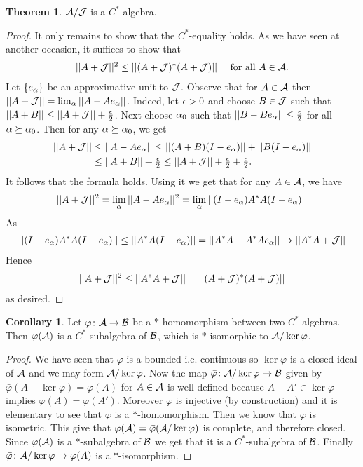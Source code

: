 \documentclass[10pt,english,a4paper]{article}
\theoremstyle{definition}
\newtheorem*{theorem}{Theorem}
\newtheorem*{corollary}{Corollary}
\begin{document}
\begin{theorem}
    $\mathcal{A} /\mathcal{J}$ is a $C^*$-algebra.
\end{theorem}
\begin{proof}
    It only remains to show that the $C^*$-equality holds. As we have seen at
another occasion, it suffices to show that 
\begin{align*}
    ||A+\mathcal{J}||^2 \leq ||(A + \mathcal{J})^*(A+ \mathcal{J})||\quad \text{ for all } A \in \mathcal{A}.
\end{align*}
Let $\{e_{\alpha}\}$ be an approximative unit to $\mathcal{J}$. Observe that for 
$A \in \mathcal{A}$ then $||A + \mathcal{J}|| = \lim_{\alpha}||A-Ae_{\alpha}||$. 
Indeed, let $\epsilon > 0$ and choose $B \in \mathcal{J}$ such that 
$||A+B|| \leq ||A+\mathcal{J}|| + \tfrac{\epsilon}{2}$. Next choose $\alpha_0$ such that 
$||B-Be_{\alpha}|| \leq \tfrac{\epsilon}{2}$ for all $\alpha \succeq \alpha_0$. 
Then for any $\alpha \succeq \alpha_0$, we get
\begin{align*}
    ||A+\mathcal{J}|| &\leq ||A-Ae_{\alpha}|| \leq ||(A+B)(I-e_{\alpha})|| + ||B(I-e_{\alpha})|| \\
&\leq ||A+B|| + \tfrac{\epsilon}{2} \leq ||A+\mathcal{J}|| + \tfrac{\epsilon}{2}+ \tfrac{\epsilon}{2}.
\end{align*}
It follows that the formula holds. Using it we get that for any $A \in \mathcal{A}$,
we have
\begin{align*}
    ||A+\mathcal{J}||^2 &= \lim_{\alpha} ||A-Ae_{\alpha}||^2 = \lim_{\alpha} ||(I-e_{\alpha})A^*A (I-e_{\alpha})||\\
\end{align*}
As
\begin{align*}
    ||(I-e_{\alpha})A^*A (I-e_{\alpha})|| \leq ||A^*A (I-e_{\alpha})|| = ||A^*A-A^*Ae_{\alpha}|| \to || A^*A + \mathcal{J}|| 
\end{align*}
Hence 
\begin{align*}
||A + \mathcal{J}||^2 \leq ||A^*A + \mathcal{J}|| = ||(A + \mathcal{J})^*(A+\mathcal{J})||
\end{align*}
as desired. 
\end{proof}


\begin{corollary}
    Let $\varphi \colon \mathcal{A} \to \mathcal{B}$ be a $*$-homomorphism between two 
$C^*$-algebras. Then $\varphi(\mathcal{A})$ is a $C^*$-subalgebra of $\mathcal{B}$, which 
is $*$-isomorphic to $\mathcal{A} /\ker \varphi$. 
\end{corollary}
\begin{proof}
    We have seen that $\varphi$ is a bounded i.e. continuous so $\ker\varphi$
is a closed ideal of $\mathcal{A}$ and we may form $\mathcal{A}/\ker\varphi$.
Now the map $\bar{\varphi}\colon \mathcal{A}/\ker\varphi \to \mathcal{B}$ given by
$\bar{\varphi}(A + \ker\varphi) = \varphi(A)$ for $A \in \mathcal{A}$ is 
well defined because $A-A' \in \ker\varphi$ implies 
$\varphi(A) = \varphi(A')$.
Moreover $\bar{\varphi}$ is injective (by construction) and 
it is elementary to see that $\bar{\varphi}$ is a $*$-homomorphism. 
Then we know that $\bar{\varphi}$ is isometric. This give that 
$\varphi(\mathcal{A}) = \bar{\varphi} (\mathcal{A}/\ker\varphi)$ is complete, 
and therefore closed. Since $\varphi(\mathcal{A})$ is a $*$-subalgebra of $\mathcal{B}$ we
get that it is a $C^*$-subalgebra of $\mathcal{B}$. 
Finally $\bar{\varphi}\colon \mathcal{A}/\ker\varphi \to \varphi (A)$
is a $*$-isomorphism.
\end{proof}
\end{document}

